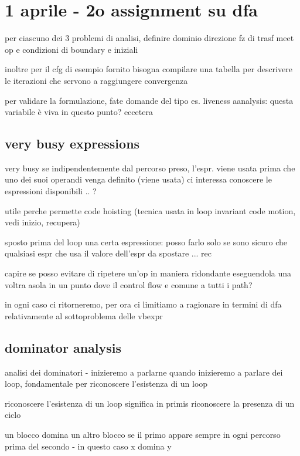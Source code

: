 \section{1 aprile - 2o assignment su dfa}

per ciascuno dei 3 problemi di analisi, definire dominio direzione fz di trasf meet op e condizioni di boundary e iniziali

inoltre per il cfg di esempio fornito bisogna compilare una tabella per descrivere le iterazioni che servono a raggiungere convergenza

per validare la formulazione, fate domande del tipo es. liveness aanalysis: questa variabile \`e viva in questo punto? eccetera

\subsection{very busy expressions}

very busy se indipendentemente dal percorso preso, l'espr. viene usata prima che uno dei suoi operandi venga definito (viene usata)
ci interessa conoscere le espressioni disponibili .. ?

utile perche permette code hoisting (tecnica usata in loop invariant code motion, vedi inizio, recupera)

sposto prima del loop una certa espressione: posso farlo solo se sono sicuro che qualsiasi espr che usa il valore dell'espr da spostare ... rec

capire se posso evitare di ripetere un'op in maniera ridondante eseguendola una voltra asola in un punto dove il control flow e comune a tutti i path?

in ogni caso ci ritorneremo, per ora ci limitiamo a ragionare in termini di dfa relativamente al sottoproblema delle vbexpr

\subsection{dominator analysis}

analisi dei dominatori - inizieremo a parlarne quando inizieremo a parlare dei loop, fondamentale per riconoscere l'esistenza di un loop

riconoscere l'esistenza di un loop significa in primis riconoscere la presenza di un ciclo

un blocco domina un altro blocco se il primo appare sempre in ogni percorso prima del secondo - in questo caso x domina y

